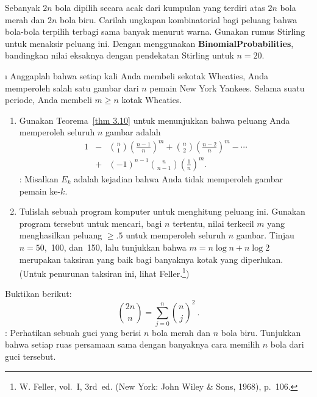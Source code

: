 \begin{LJSItem}
\istar\label{exer 3.2.33} Sebanyak $2n$ bola dipilih secara acak dari kumpulan yang
terdiri atas $2n$ bola merah dan $2n$ bola biru.  Carilah ungkapan kombinatorial bagi
peluang bahwa bola-bola terpilih terbagi sama banyak menurut warna.  Gunakan rumus
Stirling untuk menaksir peluang ini.  Dengan menggunakan {\bf BinomialProbabilities},
bandingkan nilai eksaknya dengan pendekatan Stirling untuk $n = 20$.

\i\label{exer 3.2.34} Anggaplah bahwa setiap kali Anda membeli sekotak
Wheaties, Anda memperoleh salah satu gambar dari $n$ pemain New York
Yankees.  Selama suatu periode, Anda membeli $m \geq n$ kotak
Wheaties.
\begin{enumerate}
\item Gunakan Teorema~\ref{thm 3.10} untuk menunjukkan bahwa peluang Anda memperoleh
seluruh $n$ gambar adalah
\begin{eqnarray*}
   1 &-& {n \choose 1} \left(\frac{n - 1}n\right)^m + {n \choose 2} \left(\frac{n - 2}n\right)^m -
           \cdots  \\
     &+& (-1)^{n - 1} {n \choose {n - 1}}\left(\frac 1n \right)^m.
\end{eqnarray*}
: Misalkan $E_k$ adalah kejadian bahwa Anda tidak memperoleh gambar
pemain ke-$k$.

\item Tulislah sebuah program komputer untuk menghitung peluang ini.  Gunakan program
tersebut untuk mencari, bagi $n$ tertentu, nilai terkecil $m$ yang menghasilkan peluang
$\geq .5$ untuk memperoleh seluruh $n$ gambar.  Tinjau $n = 50$,~100, dan~150, lalu
tunjukkan bahwa $m = n\log n + n \log 2$ merupakan taksiran yang baik bagi banyaknya
kotak yang diperlukan.  (Untuk penurunan taksiran ini, lihat
Feller.\footnote{W. Feller, 
vol.~I, 3rd~ed. (New York: John Wiley \& Sons, 1968), p.~106.})
\end{enumerate}

\istar\label{exer 3.2.35} Buktikan  berikut:
$$
 {2n \choose n} = \sum_{j = 0}^n { n \choose j}^2\ .
$$ : Perhatikan sebuah guci yang berisi $n$ bola merah dan $n$ bola
biru.  Tunjukkan bahwa setiap ruas persamaan sama dengan banyaknya cara memilih $n$ bola
dari guci tersebut.


\end{LJSItem}

